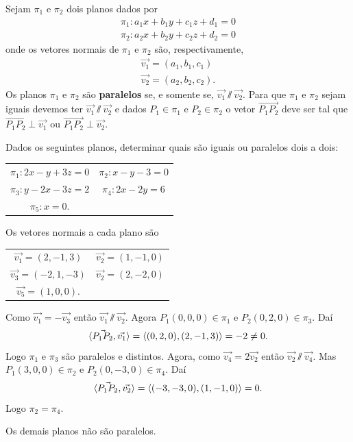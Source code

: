 Sejam $\pi_1$ e $\pi_2$ dois planos dados por
\begin{align*}
    \pi_1 : a_1x + b_1y + c_1z + d_1 = 0 \\
    \pi_2 : a_2x + b_2y + c_2z + d_2 = 0
\end{align*}
onde os vetores normais de $\pi_1$ e $\pi_2$ são, respectivamente,
\begin{align*}
    \vec{v_1} = (a_1, b_1, c_1) \\
    \vec{v_2} = (a_2, b_2, c_2).
\end{align*}
Os planos $\pi_1$ e $\pi_2$ são \textbf{paralelos} se, e somente se, $\vec{v_1} \varparallel\vec{v_2}$. Para que $\pi_1$ e $\pi_2$ sejam iguais devemos ter $\vec{v_1}\varparallel\vec{v_2}$  e dados $P_1\in\pi_1$ e $P_2\in\pi_2$ o vetor $\vec{P_1P_2}$ deve ser tal que $\vec{P_1P_2}\perp\vec{v_1}$ ou $\vec{P_1P_2}\perp\vec{v_2}$.

\begin{exemplo}
    Dados os seguintes planos, determinar quais são iguais ou paralelos dois a dois:
    \begin{center}
        \begin{tabular}{cc}
            $\pi_1 : 2x - y + 3z = 0$ &
            $\pi_2 : x - y - 3 = 0$                           \\
            $\pi_3 : y - 2x - 3z = 2$ & $\pi_4 : 2x - 2y = 6$ \\
            $\pi_5 : x = 0$.
        \end{tabular}
    \end{center}
    \begin{solucao}
        Os vetores normais a cada plano são
        \begin{center}
            \begin{tabular}{cc}
                $\vec{v_1} = (2, -1, 3)$  & $\vec{v_2} = (1,-1,0)$ \\
                $\vec{v_3} = (-2, 1, -3)$ & $\vec{v_2} = (2,-2,0)$ \\
                $\vec{v_5} = (1, 0, 0)$.
            \end{tabular}
        \end{center}
        Como $\vec{v_1} = -\vec{v_3}$ então $\vec{v_1}\varparallel\vec{v_2}$. Agora $P_1(0,0,0)\in\pi_1$ e $P_2(0,2,0)\in\pi_3$. Daí
        \[
            \langle \vec{P_1P_2}, \vec{v_1} \rangle = \langle(0,2,0), (2,-1,3)\rangle = -2 \ne 0.
        \]
        Logo $\pi_1$ e $\pi_3$ são paralelos e distintos.
        Agora, como $\vec{v_4} = 2\vec{v_2}$ então $\vec{v_2}\varparallel\vec{v_4}$. Mas $P_1(3,0,0)\in\pi_2$ e $P_2(0,-3,0)\in\pi_4$. Daí
        \[
            \langle \vec{P_1P_2}, \vec{v_2} \rangle = \langle(-3,-3,0), (1,-1,0)\rangle = 0.
        \]
        Logo $\pi_2 =\pi_4$.

        Os demais planos não são paralelos.
    \end{solucao}
\end{exemplo}

